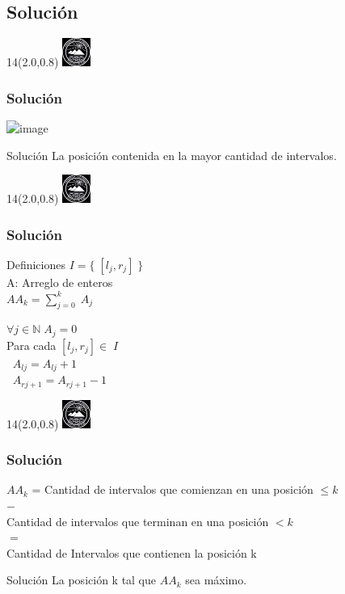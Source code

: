 \documentclass[10pt,xcolor=tables,{dvipsnames}]{beamer}
\def\N{\mathbb N}
\newcommand{\MyLogo}{%
	\begin{textblock}{14}(2.0,0.8)
		\includegraphics[height=0.925cm, angle=0]{UOWhite}
	\end{textblock}
}
\begin{document}
   	\subsection{Solución}
   	        \begin{frame}
   	        	\MyLogo
   	        	\frametitle{Solución}
   	        \begin{center}
   	        	\includegraphics<1->[scale=0.5]{IntervalosCorte}	
   	        \end{center}
   	    \begin{block}{Solución}
   	    	La posición contenida en la mayor cantidad de intervalos.
   	    \end{block}
       \end{frame}
       \begin{frame}
       	\MyLogo
       	\frametitle{Solución}
       	\begin{block}{Definiciones}
        $I = \{\; [l_j, r_j] \;\}$\\
        A: Arreglo de enteros\\
        $AA_k = \sum_{j=0}^{k} \; A_j$
       	\end{block}
       		\begin{block}{}
       			$\forall j \in \N\; A_j = 0$\\
       			Para cada $[l_j, r_j] \in \; I$\\
       			$\;\; A_{lj} = A_{lj} + 1$\\
       			$\;\; A_{rj + 1} = A_{rj + 1} - 1$
       		\end{block}
       \end{frame}
       
       \begin{frame}
       	\MyLogo
       	\frametitle{Solución}
       	\begin{block}{}
       		$AA_k$ = Cantidad de intervalos que comienzan en una posición $\leq k$\\
       		\hspace{5cm}$-$\\
       		\hspace{1.2cm}Cantidad de intervalos que terminan en una posición $<k$\\
       		\hspace{5cm}$=$\\
       		\hspace{1.2cm}Cantidad de Intervalos que contienen la posición k
       	\end{block}
       	
       	\begin{block}{Solución}
       		La posición k tal que $AA_k$ sea máximo.
       	\end{block}
       \end{frame}
       
\end{document}

